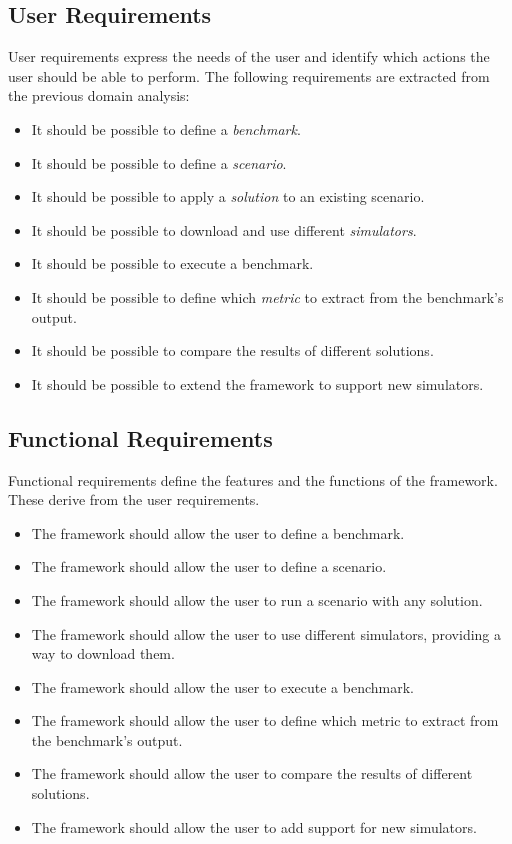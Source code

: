 \documentclass[12pt,a4paper,openright,twoside]{book}
\begin{document}
\subsection*{User Requirements}
User requirements express the needs of the user and identify which actions the user should be able to perform.
The following requirements are extracted from the previous domain analysis:
\begin{itemize}
  \item It should be possible to define a \emph{benchmark}.
  \item It should be possible to define a \emph{scenario}.
  \item It should be possible to apply a \emph{solution} to an existing scenario.
  \item It should be possible to download and use different \emph{simulators}.
  \item It should be possible to execute a benchmark.
  \item It should be possible to define which \emph{metric} to extract from the benchmark's output.
  \item It should be possible to compare the results of different solutions.
  \item It should be possible to extend the framework to support new simulators.
\end{itemize}

\subsection*{Functional Requirements}
Functional requirements define the features and the functions of the framework.
These derive from the user requirements.

\begin{itemize}
  \item The framework should allow the user to define a benchmark.
  \item The framework should allow the user to define a scenario.
  \item The framework should allow the user to run a scenario with any solution.
  \item The framework should allow the user to use different simulators, providing a way to download them.
  \item The framework should allow the user to execute a benchmark.
  \item The framework should allow the user to define which metric to extract from the benchmark's output.
  \item The framework should allow the user to compare the results of different solutions.
  \item The framework should allow the user to add support for new simulators.
\end{itemize}
\end{document}
